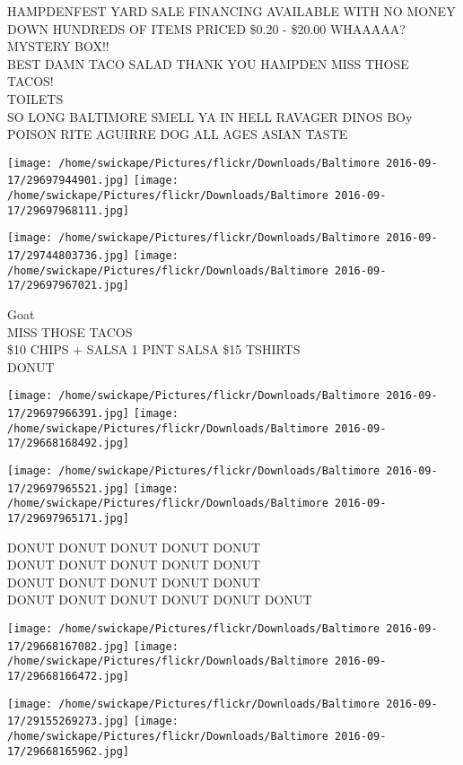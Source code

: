 \documentclass[10pt,letterpaper]{article}
\begin{document}
HAMPDENFEST YARD SALE FINANCING AVAILABLE WITH NO MONEY DOWN HUNDREDS OF ITEMS PRICED \$0.20 {-} \$20.00 WHAAAAA?  MYSTERY BOX!!\\
BEST DAMN TACO SALAD THANK YOU HAMPDEN MISS THOSE TACOS!\\
TOILETS\\
SO LONG BALTIMORE SMELL YA IN HELL RAVAGER DINOS BOy POISON RITE AGUIRRE DOG ALL AGES ASIAN TASTE
\pagebreak

\texttt{[image: /home/swickape/Pictures/flickr/Downloads/Baltimore 2016-09-17/29697944901.jpg]}
\texttt{[image: /home/swickape/Pictures/flickr/Downloads/Baltimore 2016-09-17/29697968111.jpg]}

\texttt{[image: /home/swickape/Pictures/flickr/Downloads/Baltimore 2016-09-17/29744803736.jpg]}
\texttt{[image: /home/swickape/Pictures/flickr/Downloads/Baltimore 2016-09-17/29697967021.jpg]}

Goat\\
MISS THOSE TACOS\\
\$10 CHIPS + SALSA 1 PINT SALSA \$15 TSHIRTS\\
DONUT
\pagebreak

\texttt{[image: /home/swickape/Pictures/flickr/Downloads/Baltimore 2016-09-17/29697966391.jpg]}
\texttt{[image: /home/swickape/Pictures/flickr/Downloads/Baltimore 2016-09-17/29668168492.jpg]}

\texttt{[image: /home/swickape/Pictures/flickr/Downloads/Baltimore 2016-09-17/29697965521.jpg]}
\texttt{[image: /home/swickape/Pictures/flickr/Downloads/Baltimore 2016-09-17/29697965171.jpg]}

DONUT DONUT DONUT DONUT DONUT\\
DONUT DONUT DONUT DONUT DONUT\\
DONUT DONUT DONUT DONUT DONUT\\
DONUT DONUT DONUT DONUT DONUT DONUT
\pagebreak

\texttt{[image: /home/swickape/Pictures/flickr/Downloads/Baltimore 2016-09-17/29668167082.jpg]}
\texttt{[image: /home/swickape/Pictures/flickr/Downloads/Baltimore 2016-09-17/29668166472.jpg]}

\texttt{[image: /home/swickape/Pictures/flickr/Downloads/Baltimore 2016-09-17/29155269273.jpg]}
\texttt{[image: /home/swickape/Pictures/flickr/Downloads/Baltimore 2016-09-17/29668165962.jpg]}
\end{document}
